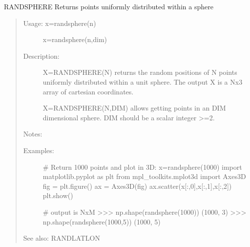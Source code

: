 \documentclass[letterpaper,10pt,english]{sphinxmanual}
\begin{document}
\begin{fulllineitems}
\label{\detokenize{infrapy.utils:infrapy.utils.latlon.randsphere}}
RANDSPHERE    Returns points uniformly distributed within a sphere
\begin{quote}
\begin{description}
\item[{Usage:    x=randsphere(n)}] \leavevmode
x=randsphere(n,dim)

\item[{Description:}] \leavevmode
X=RANDSPHERE(N) returns the random positions of N points uniformly
distributed within a unit sphere.  The output X is a Nx3 array of
cartesian coordinates.

X=RANDSPHERE(N,DIM) allows getting points in an DIM dimensional sphere.
DIM should be a scalar integer \textgreater{}=2.

\end{description}

Notes:
\begin{description}
\item[{Examples:}] \leavevmode
\# Return 1000 points and plot in 3D:
x=randsphere(1000)
import matplotlib.pyplot as plt
from mpl\_toolkits.mplot3d import Axes3D
fig = plt.figure()
ax = Axes3D(fig)
ax.scatter(x{[}:,0{]},x{[}:,1{]},x{[}:,2{]})
plt.show()

\# output is NxM
\textgreater{}\textgreater{}\textgreater{} np.shape(randsphere(1000))
(1000, 3)
\textgreater{}\textgreater{}\textgreater{} np.shape(randsphere(1000,5))
(1000, 5)

\end{description}

See also: RANDLATLON
\end{quote}

\end{fulllineitems}

\end{document}
